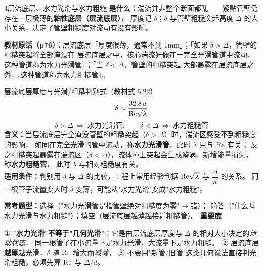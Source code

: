 \begin{kaodian}{4}{层流底层、水力光滑与水力粗糙}
\textbf{是什么：}湍流并非整个断面都乱——紧贴管壁仍存在一层极薄的\textbf{黏性底层（层流底层）}，
厚度记 $\delta$；$\delta$ 与管壁粗糙突起高度 $\Delta$ 的大小关系，决定了管壁粗糙度对流动有没有影响。

\noindent\textbf{教材原话（p76）：}层流底层「厚度很薄，通常不到 1mm」；「如果 $\delta>\Delta$，管壁的粗糙突起将全部淹没在
层流底层之中，核心湍流好像在一完全光滑管道中流动，这种管道称为水力光滑管」；「当 $\delta<\Delta$，管壁的粗糙突起
大部暴露在层流底层之外……这种管道称为水力粗糙管」。

\begin{gongshi}{层流底层厚度与光滑/粗糙判别式（教材式 5.22）}
\[ \delta\approx\frac{32.8\,d}{\mathrm{Re}\sqrt{\lambda}} \]
\[ \delta>\Delta\ \Rightarrow\ \text{水力光滑管};\qquad \delta<\Delta\ \Rightarrow\ \text{水力粗糙管} \]
\textbf{含义：}当层流底层完全淹没管壁的粗糙突起（$\delta>\Delta$）时，湍流区感受不到粗糙度的影响，
如同在完全光滑的管中流动，称\textbf{水力光滑管}，此时 $\lambda$ 只与 $\mathrm{Re}$ 有关；
反之粗糙突起暴露在湍流区（$\delta<\Delta$），流体撞上突起会生成漩涡、新增能量损失，称\textbf{水力粗糙管}，
此时 $\lambda$ 与相对粗糙度有关。\\
\textbf{适用条件：}判别用 $\delta$ 与 $\Delta$ 的比较，工程上常用经验判据 $\mathrm{Re}\sqrt{\lambda}$ 与 $\dfrac{\Delta}{d}$ 的关系。
同一根管子流量变大时 $\delta$ 变薄，可能从"水力光滑"变成"水力粗糙"。
\end{gongshi}

\textbf{常考题型：}选择（"水力光滑管是指管壁绝对粗糙度为零"$\to$错）；
简答（"什么叫水力光滑与水力粗糙"）；填空（层流底层越薄越接近粗糙管）。
\textbf{重要度 }\quad{}\quad{}

\begin{yicuo}
① \textbf{"水力光滑"不等于"几何光滑"}：它是由层流底层厚度与 $\Delta$ 的相对大小决定的\emph{流动状态}，
同一根管子在小流量下是水力光滑、大流量下是水力粗糙。
② 层流底层\textbf{越厚}越光滑，$\delta$ 随 $\mathrm{Re}$ 增大而\emph{减薄}。
③ 不要用"新管/旧管"这类几何说法直接判光滑粗糙，必须先算 $\mathrm{Re}$ 与 $\Delta/d$。
\end{yicuo}
\end{kaodian}

